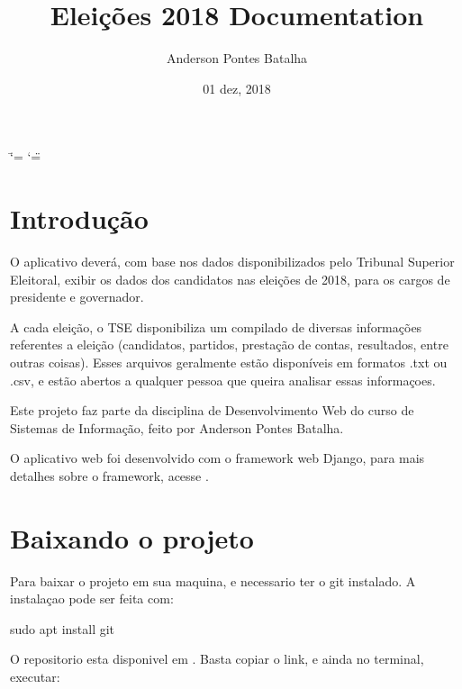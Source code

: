 \documentclass[letterpaper,10pt,portuges]{sphinxmanual}
\title{Eleições 2018 Documentation}
\date{01 dez, 2018}
\author{Anderson Pontes Batalha}
\begin{document}
\ifdefined\shorthandoff
  \ifnum\catcode`\=\string=\active\shorthandoff{=}\fi
  \ifnum\catcode`\"=\active{}\fi
\fi

\pagestyle{empty}
\maketitle
\pagestyle{plain}
\sphinxtableofcontents
\pagestyle{normal}
\label{\detokenize{index::doc}}



\chapter{Introdução}
\label{\detokenize{introducao:introducao}}\label{\detokenize{introducao::doc}}
O aplicativo deverá, com base nos dados disponibilizados pelo Tribunal Superior Eleitoral, exibir os dados dos candidatos nas eleições de 2018, para os cargos de presidente e governador.

A cada eleição, o TSE disponibiliza um compilado de diversas informações referentes a eleição (candidatos, partidos, prestação de contas, resultados, entre outras coisas). Esses arquivos geralmente estão disponíveis em formatos .txt ou .csv, e estão abertos a qualquer pessoa que queira analisar essas informaçoes.

Este projeto faz parte da disciplina de Desenvolvimento Web do curso de Sistemas de Informação, feito por Anderson Pontes Batalha.

O aplicativo web foi desenvolvido com o framework web Django, para mais detalhes sobre o framework, acesse .


\chapter{Baixando o projeto}
\label{\detokenize{clonar_repositorio_git:baixando-o-projeto}}\label{\detokenize{clonar_repositorio_git::doc}}
Para baixar o projeto em sua maquina, e necessario ter o git instalado. A instalaçao pode ser feita com:

%
\begin{sphinxVerbatim}[commandchars=\\\{\}]
\PYGZdl{} sudo apt install git
\end{sphinxVerbatim}

O repositorio esta disponivel em . Basta copiar o link, e ainda no terminal, executar:
\end{document}
